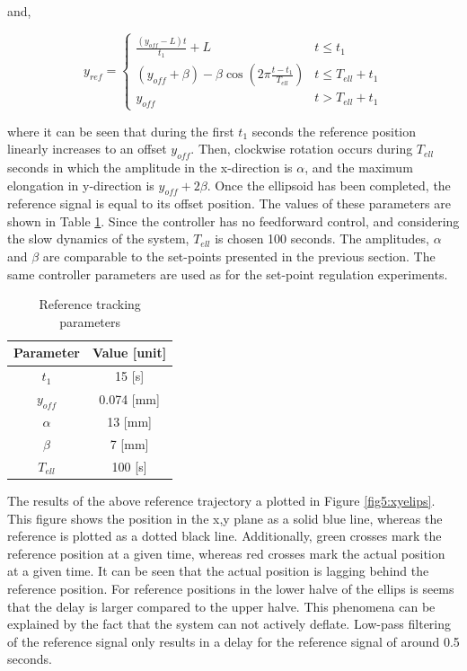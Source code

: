 and,


\begin{equation}
    y_{ref} = \begin{cases} 
      \frac{(y_{off} - L) t}{t_1} + L&  t \leq t_1 \\
     (y_{off} +\beta) -  \beta \cos(2\pi \frac{t - t_1}{T_{ell}}) & t \leq T_{ell} + t_1 \\
     y_{off} & t > T_{ell} + t_1
   \end{cases} 
\end{equation}


where it can be seen that during the first $t_1$ seconds the reference position linearly increases to an offset $y_{off}$. Then, clockwise rotation occurs during $T_{ell}$ seconds in which the amplitude in the x-direction is $\alpha$, and the maximum elongation in y-direction is $y_{off} + 2\beta$. Once the ellipsoid has been completed, the reference signal is equal to its offset position. The values of these parameters are shown in Table \ref{tab5:refparams}. Since the controller has no feedforward control, and considering the slow dynamics of the system, $T_{ell}$ is chosen 100 seconds. The amplitudes, $\alpha$ and $\beta$ are comparable to the set-points presented in the previous section. The same controller parameters are used as for the set-point regulation experiments.


\begin{table}[H]
    \centering
    \caption{Reference tracking parameters}
    \begin{tabular}{|c|c|} \hline
   \textbf{Parameter}  & \textbf{Value [unit]} \\ \hline
    $t_1$ &   15 [s]  \\ 
    $y_{off}$ & 0.074 [mm] \\
    $\alpha$ & 13 [mm] \\
    $\beta$ & 7 [mm] \\
    $T_{ell}$ & 100 [s] \\ \hline
\end{tabular}
    \label{tab5:refparams}
\end{table}

The results of the above reference trajectory a plotted in Figure \ref{fig5:xyelips}. This figure shows the position in the x,y plane as a solid blue line, whereas the reference is plotted as a dotted black line. Additionally, green crosses mark the reference position at a given time, whereas red crosses mark the actual position at a given time. It can be seen that the actual position is lagging behind the reference position. For reference positions in the lower halve of the ellips is seems that the delay is larger compared to the upper halve. This phenomena can be explained by the fact that the system can not actively deflate. 
Low-pass filtering of the reference signal only results in a delay for the reference signal of around 0.5 seconds. 


